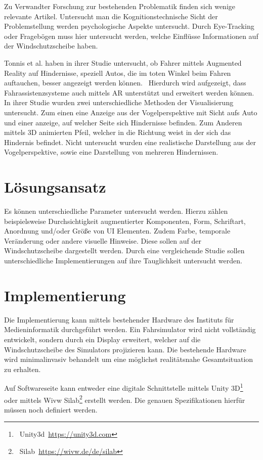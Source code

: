 \documentclass[a4paper, 11pt]{article}
\begin{document}
Zu Verwandter Forschung zur bestehenden Problematik finden sich wenige relevante Artikel. Untersucht man die Kognitionstechnische Sicht der Problemstellung werden psychologische Aspekte untersucht. Durch Eye-Tracking oder Fragebögen muss hier untersucht werden, welche Einflüsse Informationen auf der Windschutzscheibe haben.

Tonnis et al. haben in ihrer Studie untersucht, ob Fahrer mittels Augmented Reality auf Hindernisse, speziell Autos, die im toten Winkel beim Fahren auftauchen, besser angezeigt werden können.~\cite{tonnis2005attention} Hierdurch wird aufgezeigt, dass Fahrassistenzsysteme auch mittels AR unterstützt und erweitert werden können. In ihrer Studie wurden zwei unterschiedliche Methoden der Visualisierung untersucht. Zum einen eine Anzeige aus der Vogelperspektive mit Sicht aufs Auto und einer anzeige, auf welcher Seite sich Hindernisse befinden. Zum Anderen mittels 3D animierten Pfeil, welcher in die Richtung weist in der sich das Hindernis befindet. Nicht untersucht wurden eine realistische Darstellung aus der Vogelperspektive, sowie eine Darstellung von mehreren Hindernissen. 

\section*{Lösungsansatz}
Es können unterschiedliche Parameter untersucht werden. Hierzu zählen beispielsweise Durchsichtigkeit augmentierter Komponenten, Form, Schriftart,  Anordnung und/oder Größe von UI Elementen. Zudem Farbe, temporale Veränderung oder andere visuelle Hinweise. Diese sollen auf der Windschutzscheibe dargestellt werden. Durch eine vergleichende Studie sollen unterschiedliche Implementierungen auf ihre Tauglichkeit untersucht werden. 

\section*{Implementierung}
Die Implementierung kann mittels bestehender Hardware des Instituts für Medieninformatik durchgeführt werden. Ein Fahrsimulator wird nicht vollständig entwickelt, sondern durch ein Display erweitert, welcher auf die Windschutzscheibe des Simulators projizieren kann. Die bestehende Hardware wird minimalinvasiv behandelt um eine möglichst realitätsnahe Gesamtsituation zu erhalten. 

Auf Softwareseite kann entweder eine digitale Schnittstelle mittels Unity 3D\footnote{~Unity3d~\url{https://unity3d.com}} oder mittels Wivw Silab\footnote{~Silab~\url{https://wivw.de/de/silab}} erstellt werden. Die genauen Spezifikationen hierfür müssen noch definiert werden.
\end{document}
